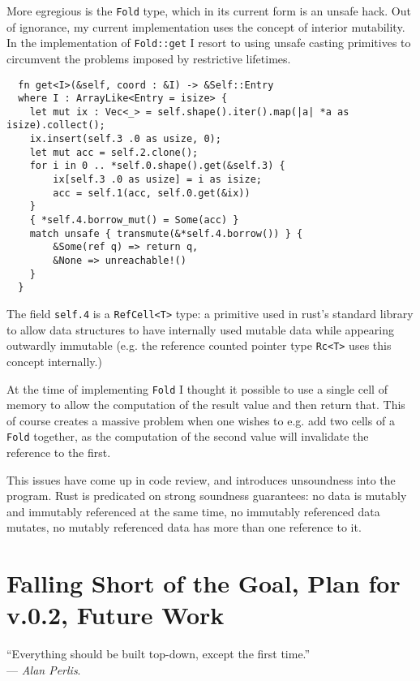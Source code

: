 \documentclass{DIKU-report-variant}
\begin{document}
More egregious is the \texttt{Fold} type, which in its current form is an unsafe hack.
Out of ignorance, my current implementation uses the concept of interior mutability\cite[chapter 3.11]{RPL117}.
In the implementation of \texttt{Fold::get} I resort to using unsafe casting primitives to
circumvent the problems imposed by restrictive lifetimes.
\begin{lstlisting}
  fn get<I>(&self, coord : &I) -> &Self::Entry
  where I : ArrayLike<Entry = isize> { 
    let mut ix : Vec<_> = self.shape().iter().map(|a| *a as isize).collect();
    ix.insert(self.3 .0 as usize, 0);
    let mut acc = self.2.clone();
    for i in 0 .. *self.0.shape().get(&self.3) {
        ix[self.3 .0 as usize] = i as isize;
        acc = self.1(acc, self.0.get(&ix))
    }
    { *self.4.borrow_mut() = Some(acc) }
    match unsafe { transmute(&*self.4.borrow()) } {
        &Some(ref q) => return q,
        &None => unreachable!()
    }
  }
\end{lstlisting}
The field \texttt{self.4} is a \texttt{RefCell<T>} type: a primitive used in rust's standard
library to allow data structures to have internally used mutable data while appearing 
outwardly immutable (e.g. the reference counted pointer type \texttt{Rc<T>} uses this
concept internally.)

At the time of implementing \texttt{Fold} I thought it possible to use a single cell
of memory to allow the computation of the result value and then return that. This of
course creates a massive problem when one wishes to e.g. add two cells of a \texttt{Fold}
together, as the computation of the second value will invalidate the reference to the
first.

This issues have come up in code review, and introduces unsoundness into the program. 
Rust is predicated on strong soundness guarantees: no data is mutably and immutably
referenced at the same time, no immutably referenced data mutates, no mutably referenced
data has more than one reference to it.

\section{Falling Short of the Goal, Plan for v.0.2, Future Work}

\begin{center}
  ``Everything should be built top-down, except the first time.''\\
  --- \emph{Alan Perlis}\cite{AP82}.
\end{center}
\end{document}
